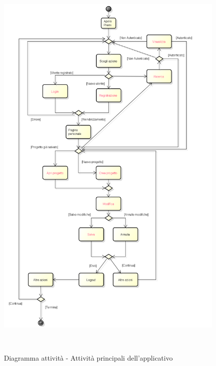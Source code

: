 \begin{figure}[p] 
	\centering 
	\includegraphics[height=20cm, keepaspectratio] {img/activity_diagram.png} 
	\caption{Diagramma attività - Attività principali dell'applicativo \PROGETTO} 
\end{figure}

\newpage

